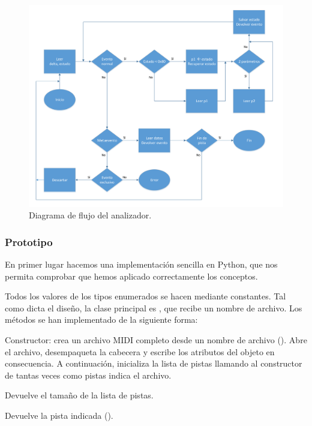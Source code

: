 \begin{figure}[H]
	\noindent \begin{centering}
		\includegraphics[width=\linewidth]{capitulo5/flujo_parser}
		\par\end{centering}
	\smallskip
	\caption{\label{fig:flujo_parser} Diagrama de flujo del analizador.}
\end{figure}

\smallskip

\subsubsection{Prototipo}

En primer lugar hacemos una implementación sencilla en Python, que nos permita comprobar que hemos aplicado correctamente los conceptos.

Todos los valores de los tipos enumerados se hacen mediante constantes. Tal como dicta el diseño, la clase principal es , que recibe un nombre de archivo. Los métodos se han implementado de la siguiente forma:

\begin{description}[style=nextline]
	\item[\code{\_\_init\_\_(self, pathname)}]
	Constructor: crea un archivo \acrshort{MIDI} completo desde un nombre de archivo (). Abre el archivo, desempaqueta la cabecera y escribe los atributos del objeto en consecuencia. A continuación, inicializa la lista de pistas llamando al constructor de  tantas veces como pistas indica el archivo.
	
	\item[\code{\_\_len\_\_(self)}]
	Devuelve el tamaño de la lista de pistas.
	
	\item[\code{\_\_getitem\_\_(self, key)}]
	Devuelve la pista indicada ().
	
\end{description}

